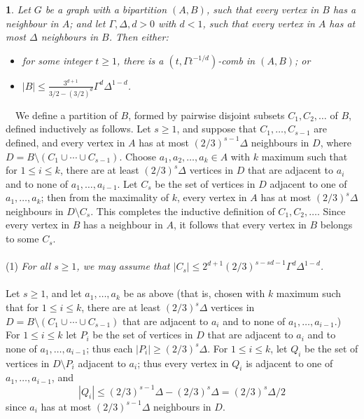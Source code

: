 \documentclass[titlepage,11pt]{article}
\def\ll{,\ldots,}
\def\cupcup{\cup\cdots\cup}
\newtheorem{thm}{}[section]
\newcommand{\Proof}{\noindent{\bf Proof.}\ \ }
\begin{document}
\begin{thm}\label{mainlemma}
Let $G$ be a graph with a bipartition $(A,B)$, such that every vertex in $B$ has a neighbour in $A$; 
and let $\Gamma, \Delta, d>0$ with $d<1$, such that every vertex in $A$ has at most $\Delta$ neighbours in $B$.
Then either:
\begin{itemize}
\item 
for some integer $t\ge 1$, there is a $(t,\Gamma t^{-1/d})$-comb in $(A,B)$; or
\item 
$|B|\le \frac{3^{d+1}}{3/2-(3/2)^{d}}\Gamma^d\Delta^{1-d}$.
\end{itemize}
\end{thm}
\Proof We define a partition of $B$, formed by pairwise disjoint subsets $C_1,C_2,\ldots$ of $B$, defined inductively as follows. 
Let $s\ge 1$, and
suppose that $C_1\ll C_{s-1}$ are defined, and every vertex in $A$ has at most $(2/3)^{s-1}\Delta$ neighbours in $D$, where
$D=B\setminus (C_1\cupcup C_{s-1})$. Choose $a_1,a_2\ll a_k\in A$ with $k$ maximum such that for $1\le i\le k$, there are at
least $(2/3)^{s}\Delta$ vertices in $D$ that are adjacent to $a_i$ and to none of $a_1\ll a_{i-1}$. Let $C_{s}$ be the set of vertices
in $D$ adjacent to one of $a_1\ll a_k$; then from the maximality of $k$, every vertex in $A$ has at most $(2/3)^{s}\Delta$
neighbours in $D\setminus C_{s}$. This completes the inductive definition of $C_1, C_2,\ldots$. Since every vertex in 
$B$
has a neighbour in $A$, it follows that every vertex in $B$ belongs to some $C_s$. 
\\
\\
(1) {\em For all $s\ge 1$, we may assume that $|C_{s}|\le 2^{d+1}(2/3)^{s-sd-1}\Gamma^d\Delta^{1-d}$.}
\\
\\
Let $s\ge 1$, and let $a_1\ll a_k$ be as above (that is, chosen with $k$ maximum such that for $1\le i\le k$, 
there are at
least $(2/3)^{s}\Delta$ vertices in $D=B\setminus (C_1\cupcup C_{s-1})$ that are adjacent to $a_i$ and to none of $a_1\ll a_{i-1}$.) 
For $1\le i\le k$ let $P_i$
be the set of vertices  in $D$ that are adjacent to $a_i$ and to none of $a_1\ll a_{i-1}$; thus each 
$|P_i|\ge (2/3)^{s}\Delta$.
For $1\le i\le k$, let $Q_i$ be the set of vertices in $D\setminus P_i$ adjacent to $a_i$;
thus every vertex in $Q_i$ is adjacent to one of $a_1\ll a_{i-1}$, and 
$$|Q_i| \le (2/3)^{s-1}\Delta - (2/3)^{s}\Delta=(2/3)^{s}\Delta/2$$
since $a_i$ has at most $(2/3)^{s-1}\Delta$ neighbours in $D$.
\end{document}
